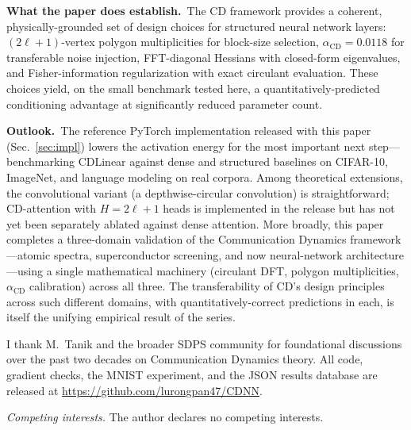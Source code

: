 \documentclass[aps,prx,onecolumn,11pt,nofootinbib,longbibliography]{revtex4-2}
\newcommand{\alphaCD}{\alpha_{\mathrm{CD}}}
\begin{document}
\smallskip
\noindent\textbf{What the paper does establish.}~The CD framework provides
a coherent, physically-grounded set of design choices for structured neural
network layers: $(2\ell+1)$-vertex polygon multiplicities for block-size
selection, $\alphaCD = 0.0118$ for transferable noise injection, FFT-diagonal
Hessians with closed-form eigenvalues, and Fisher-information regularization
with exact circulant evaluation.  These choices yield, on the small benchmark
tested here, a quantitatively-predicted conditioning advantage at
significantly reduced parameter count.

\smallskip
\noindent\textbf{Outlook.}~The reference PyTorch implementation released
with this paper (Sec.~\ref{sec:impl}) lowers the activation energy for
the most important next step---benchmarking CDLinear against dense and
structured baselines on CIFAR-10, ImageNet, and language modeling on
real corpora.  Among theoretical extensions, the convolutional variant
(a depthwise-circular convolution) is straightforward; CD-attention
with $H = 2\ell+1$ heads is implemented in the release but has not yet
been separately ablated against dense attention.  More broadly, this
paper completes a three-domain validation of the Communication Dynamics
framework---atomic spectra, superconductor screening, and now
neural-network architecture---using a single mathematical machinery
(circulant DFT, polygon multiplicities, $\alphaCD$ calibration) across
all three.  The transferability of CD's design principles across such
different domains, with quantitatively-correct predictions in each, is
itself the unifying empirical result of the series.

\begin{acknowledgments}
I thank M.~Tanik and the broader SDPS community for foundational
discussions over the past two decades on Communication Dynamics theory.
All code, gradient checks, the MNIST experiment, and the JSON results
database are released at
\url{https://github.com/lurongpan47/CDNN}.

\textit{Competing interests.}  The author declares no competing interests.
\end{acknowledgments}
\end{document}
